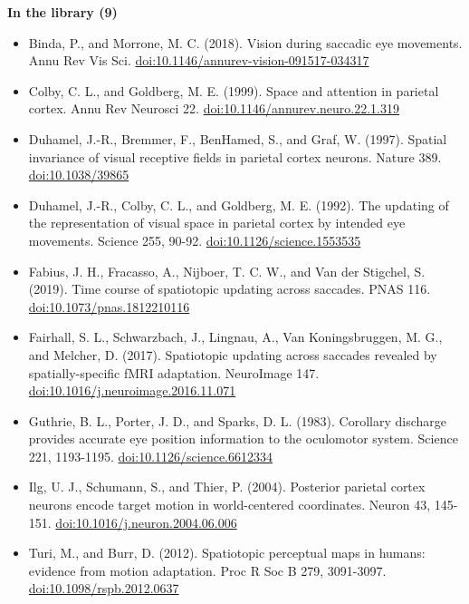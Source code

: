 \documentclass[11pt,a4paper]{article}
\begin{document}
\textbf{In the library (9)}

\begin{itemize}[itemsep=2pt,topsep=2pt]
\item Binda, P., and Morrone, M. C. (2018). Vision during saccadic eye movements. Annu Rev Vis Sci. \href{https://doi.org/10.1146/annurev-vision-091517-034317}{doi:10.1146/annurev-vision-091517-034317}
\item Colby, C. L., and Goldberg, M. E. (1999). Space and attention in parietal cortex. Annu Rev Neurosci 22. \href{https://doi.org/10.1146/annurev.neuro.22.1.319}{doi:10.1146/annurev.neuro.22.1.319}
\item Duhamel, J.-R., Bremmer, F., BenHamed, S., and Graf, W. (1997). Spatial invariance of visual receptive fields in parietal cortex neurons. Nature 389. \href{https://doi.org/10.1038/39865}{doi:10.1038/39865}
\item Duhamel, J.-R., Colby, C. L., and Goldberg, M. E. (1992). The updating of the representation of visual space in parietal cortex by intended eye movements. Science 255, 90-92. \href{https://doi.org/10.1126/science.1553535}{doi:10.1126/science.1553535}
\item Fabius, J. H., Fracasso, A., Nijboer, T. C. W., and Van der Stigchel, S. (2019). Time course of spatiotopic updating across saccades. PNAS 116. \href{https://doi.org/10.1073/pnas.1812210116}{doi:10.1073/pnas.1812210116}
\item Fairhall, S. L., Schwarzbach, J., Lingnau, A., Van Koningsbruggen, M. G., and Melcher, D. (2017). Spatiotopic updating across saccades revealed by spatially-specific fMRI adaptation. NeuroImage 147. \href{https://doi.org/10.1016/j.neuroimage.2016.11.071}{doi:10.1016/j.neuroimage.2016.11.071}
\item Guthrie, B. L., Porter, J. D., and Sparks, D. L. (1983). Corollary discharge provides accurate eye position information to the oculomotor system. Science 221, 1193-1195. \href{https://doi.org/10.1126/science.6612334}{doi:10.1126/science.6612334}
\item Ilg, U. J., Schumann, S., and Thier, P. (2004). Posterior parietal cortex neurons encode target motion in world-centered coordinates. Neuron 43, 145-151. \href{https://doi.org/10.1016/j.neuron.2004.06.006}{doi:10.1016/j.neuron.2004.06.006}
\item Turi, M., and Burr, D. (2012). Spatiotopic perceptual maps in humans: evidence from motion adaptation. Proc R Soc B 279, 3091-3097. \href{https://doi.org/10.1098/rspb.2012.0637}{doi:10.1098/rspb.2012.0637}
\end{itemize}
\end{document}
